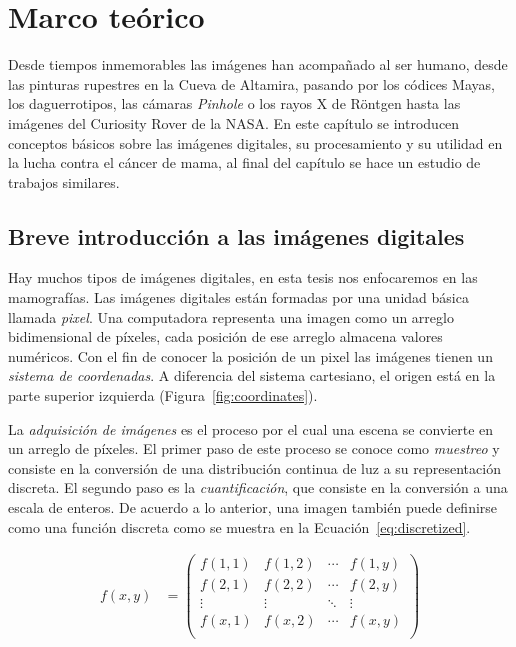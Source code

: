 \chapter{Marco teórico}
\label{marco}

Desde tiempos inmemorables las imágenes han acompañado al ser humano, desde las
pinturas rupestres en la Cueva de Altamira, pasando por los códices Mayas, los
daguerrotipos, las cámaras \textit{Pinhole} o los rayos X de Röntgen hasta las
imágenes del Curiosity Rover de la NASA. En este capítulo se introducen
conceptos básicos sobre las imágenes digitales, su procesamiento y su utilidad
en la lucha contra el cáncer de mama, al final del capítulo se hace un estudio
de trabajos similares.

\section{Breve introducción a las imágenes digitales}


Hay muchos tipos de imágenes digitales, en esta tesis nos enfocaremos en las
mamografías. Las imágenes digitales están formadas por una unidad básica
llamada \textit{pixel}. Una computadora representa una imagen como un arreglo
bidimensional de píxeles, cada posición de ese arreglo almacena valores
numéricos. Con el fin de conocer la posición de un pixel las imágenes tienen un
\textit{sistema de coordenadas}. A diferencia del sistema cartesiano, el origen
está en la parte superior izquierda (Figura~\ref{fig:coordinates}).

\shorthandoff{>} %
    
\shorthandon{>}

La \textit{adquisición de imágenes} es el proceso por el cual una escena se
convierte en un arreglo de píxeles. El primer paso de este proceso se conoce
como \textit{muestreo} y consiste en la conversión de una distribución continua
de luz a su representación discreta. El segundo paso es la
\textit{cuantificación}, que consiste en la conversión a una escala de enteros.
De acuerdo a lo anterior, una imagen también puede definirse como una función
discreta como se muestra en la Ecuación~\ref{eq:discretized}.

\begin{equation}
\label{eq:discretized}
    \begin{split}
            f(x,y) & =
            \begin{pmatrix}
                f(1,1) & f(1,2) & \cdots & f(1,y) \\
                f(2,1) & f(2,2) & \cdots & f(2,y) \\
                \vdots & \vdots & \ddots & \vdots \\
                f(x,1) & f(x,2) & \cdots & f(x,y) \\
            \end{pmatrix}
    \end{split}
\end{equation}

